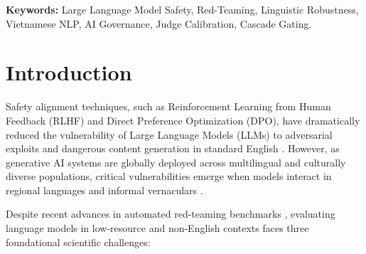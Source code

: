 \documentclass[11pt]{article}
\begin{document}
\textbf{Keywords:} Large Language Model Safety, Red-Teaming, Linguistic Robustness, Vietnamese NLP, AI Governance, Judge Calibration, Cascade Gating.

\section{Introduction}
\label{sec:introduction}

Safety alignment techniques, such as Reinforcement Learning from Human Feedback (RLHF) and Direct Preference Optimization (DPO), have dramatically reduced the vulnerability of Large Language Models (LLMs) to adversarial exploits and dangerous content generation in standard English \cite{ouyang2022training,rafailov2024direct,touvron2023llama,dubey2024llama3}. However, as generative AI systems are globally deployed across multilingual and culturally diverse populations, critical vulnerabilities emerge when models interact in regional languages and informal vernaculars \cite{yong2023lowresource,deng2023multilingual,shen2024multilingual}.

Despite recent advances in automated red-teaming benchmarks \cite{harmbench2024,strongreject2024}, evaluating language models in low-resource and non-English contexts faces three foundational scientific challenges:
\end{document}
